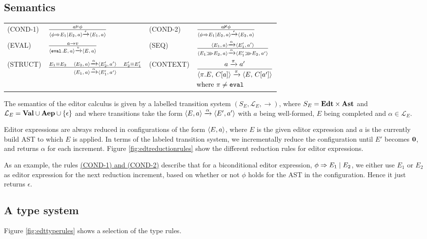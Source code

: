 \subsection{Semantics}

\begin{figure*}
  \center
  \renewcommand{\arraystretch}{2}
  \begin{tabular}{llll}
    \scriptsize(COND-1)  & $ \CondOne $           & \scriptsize(COND-2) & $ \CondTwo$ \\
    \scriptsize(EVAL)    & $ \Eval $              & \scriptsize(SEQ)    & $ \Seq$     \\
    \scriptsize(STRUCT)  & $\Struct$              & \scriptsize(CONTEXT)& \scriptsize$\Context$
  \end{tabular}
  \caption{Editor Expression reduction rules}
  \label{fig:edtreductionrules}
\end{figure*}

The semantics of the editor calculus is given by a labelled transition system
$(S_E, \mathcal{L}_E, \to)$, where $S_E = \edt \times \AST$ and $\mathcal{L}_E
= \val \cup \aep \cup \{\epsilon\}$ and where transitions take the form
$\breakpoint{E, a} \transition{$\alpha$} \breakpoint{E', a'}$ with $a$ being
well-formed, $E$ being completed and $\alpha \in \mathcal{L}_E$. 

Editor expressions are always reduced in configurations of the form
$\breakpoint{E,a}$, where $E$ is the given editor expression and $a$ is the
currently build AST to which $E$ is applied. In terms of the labeled
transition system, we incrementally reduce the configuration until $E'$ becomes
$\nil$, and returns $\alpha$ for each increment. Figure
\ref{fig:edtreductionrules} show the different reduction rules for editor
expressions.

As an example, the rules \hyperref[fig:edtreductionrules]{(COND-1) and (COND-2)} describe that
for a biconditional editor expression, $\bicond{\phi}{E_1}{E_2}$, we either use
$E_1$ or $E_2$ as editor expression for the next reduction increment, based on
whether or not $\phi$ holds for the AST in the configuration. Hence it just
returns $\epsilon$.

\subsection{A type system}

Figure \ref{fig:edttyperules} shows a selection of the type rules.

